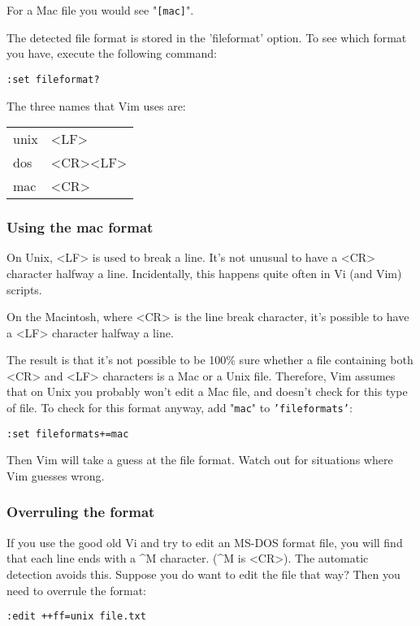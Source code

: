 For a Mac file you would see "\texttt{[mac]}".

The detected file format is stored in the 'fileformat' option.
To see which format you have, execute the following command:

\begin{Verbatim}[samepage=true]
 :set fileformat?
\end{Verbatim}

The three names that Vim uses are:
\begin{center} \begin{tabular}{l l}
				unix & <LF> \\
				dos & <CR><LF> \\
				mac & <CR>
\end{tabular} \end{center}
\subsubsection{Using the mac format}
On Unix, <LF> is used to break a line.
It's not unusual to have a <CR> character halfway a line.
Incidentally, this happens quite often in Vi (and Vim) scripts.

On the Macintosh, where <CR> is the line break character, it's possible to have a <LF> character halfway a line.

The result is that it's not possible to be 100\% sure whether a file containing both <CR> and <LF> characters is a Mac or a Unix file.
Therefore, Vim assumes that on Unix you probably won't edit a Mac file, and doesn't check for this type of file.
To check for this format anyway, add "\texttt{mac}" to \texttt{'fileformats'}:

\begin{Verbatim}[samepage=true]
 :set fileformats+=mac
\end{Verbatim}

Then Vim will take a guess at the file format.
Watch out for situations where Vim guesses wrong.
\subsubsection{Overruling the format}
If you use the good old Vi and try to edit an MS-DOS format file, you will find that each line ends with a \textasciicircum M character.
(\textasciicircum M is <CR>).
The automatic detection avoids this.
Suppose you do want to edit the file that way?  Then you need to overrule the format:

\begin{Verbatim}[samepage=true]
 :edit ++ff=unix file.txt
\end{Verbatim}

